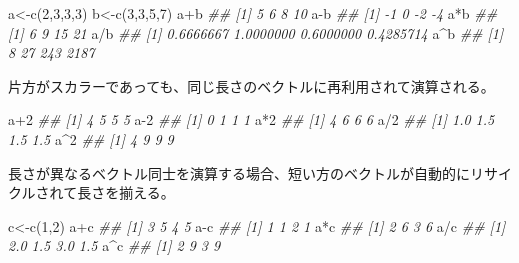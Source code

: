 \documentclass[
  letterpaper,
  xelatex,
  ja=standard, xelatex]{bxjsbook}
\newenvironment{Shaded}{\begin{snugshade}}{\end{snugshade}}
\newcommand{\DecValTok}[1]{\textcolor[rgb]{0.68,0.00,0.00}{#1}}
\newcommand{\DocumentationTok}[1]{\textcolor[rgb]{0.37,0.37,0.37}{\textit{#1}}}
\newcommand{\FunctionTok}[1]{\textcolor[rgb]{0.28,0.35,0.67}{#1}}
\newcommand{\NormalTok}[1]{\textcolor[rgb]{0.00,0.23,0.31}{#1}}
\newcommand{\OtherTok}[1]{\textcolor[rgb]{0.00,0.23,0.31}{#1}}
\newcommand{\SpecialCharTok}[1]{\textcolor[rgb]{0.37,0.37,0.37}{#1}}
\begin{document}
\begin{Shaded}
\begin{Highlighting}[]
\NormalTok{a}\OtherTok{\textless{}{-}}\FunctionTok{c}\NormalTok{(}\DecValTok{2}\NormalTok{,}\DecValTok{3}\NormalTok{,}\DecValTok{3}\NormalTok{,}\DecValTok{3}\NormalTok{)}
\NormalTok{b}\OtherTok{\textless{}{-}}\FunctionTok{c}\NormalTok{(}\DecValTok{3}\NormalTok{,}\DecValTok{3}\NormalTok{,}\DecValTok{5}\NormalTok{,}\DecValTok{7}\NormalTok{)}
\NormalTok{a}\SpecialCharTok{+}\NormalTok{b}
\DocumentationTok{\#\# [1]  5  6  8 10}
\NormalTok{a}\SpecialCharTok{{-}}\NormalTok{b}
\DocumentationTok{\#\# [1] {-}1  0 {-}2 {-}4}
\NormalTok{a}\SpecialCharTok{*}\NormalTok{b}
\DocumentationTok{\#\# [1]  6  9 15 21}
\NormalTok{a}\SpecialCharTok{/}\NormalTok{b}
\DocumentationTok{\#\# [1] 0.6666667 1.0000000 0.6000000 0.4285714}
\NormalTok{a}\SpecialCharTok{\^{}}\NormalTok{b}
\DocumentationTok{\#\# [1]    8   27  243 2187}
\end{Highlighting}
\end{Shaded}

片方がスカラーであっても、同じ長さのベクトルに再利用されて演算される。

\begin{Shaded}
\begin{Highlighting}[]
\NormalTok{a}\SpecialCharTok{+}\DecValTok{2}
\DocumentationTok{\#\# [1] 4 5 5 5}
\NormalTok{a}\DecValTok{{-}2}
\DocumentationTok{\#\# [1] 0 1 1 1}
\NormalTok{a}\SpecialCharTok{*}\DecValTok{2}
\DocumentationTok{\#\# [1] 4 6 6 6}
\NormalTok{a}\SpecialCharTok{/}\DecValTok{2}
\DocumentationTok{\#\# [1] 1.0 1.5 1.5 1.5}
\NormalTok{a}\SpecialCharTok{\^{}}\DecValTok{2}
\DocumentationTok{\#\# [1] 4 9 9 9}
\end{Highlighting}
\end{Shaded}

長さが異なるベクトル同士を演算する場合、短い方のベクトルが自動的にリサイクルされて長さを揃える。

\begin{Shaded}
\begin{Highlighting}[]
\NormalTok{c}\OtherTok{\textless{}{-}}\FunctionTok{c}\NormalTok{(}\DecValTok{1}\NormalTok{,}\DecValTok{2}\NormalTok{)}
\NormalTok{a}\SpecialCharTok{+}\NormalTok{c}
\DocumentationTok{\#\# [1] 3 5 4 5}
\NormalTok{a}\SpecialCharTok{{-}}\NormalTok{c}
\DocumentationTok{\#\# [1] 1 1 2 1}
\NormalTok{a}\SpecialCharTok{*}\NormalTok{c}
\DocumentationTok{\#\# [1] 2 6 3 6}
\NormalTok{a}\SpecialCharTok{/}\NormalTok{c}
\DocumentationTok{\#\# [1] 2.0 1.5 3.0 1.5}
\NormalTok{a}\SpecialCharTok{\^{}}\NormalTok{c}
\DocumentationTok{\#\# [1] 2 9 3 9}
\end{Highlighting}
\end{Shaded}
\end{document}
